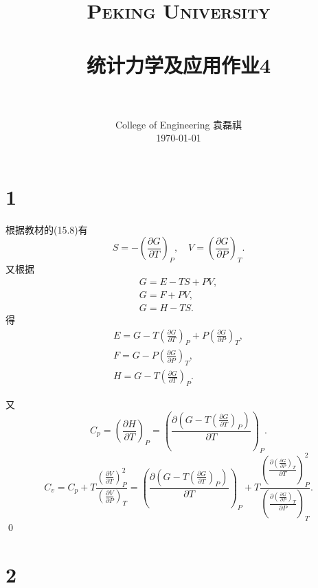 \documentclass[12pt]{article}
\title{
		\vspace{-1in} 	
		\usefont{OT1}{bch}{b}{n}
		\normalfont \normalsize \textsc{\LARGE Peking University}\\[1cm] %
		\horrule{0.5pt} \\[0.5cm]
		\huge \bfseries{统计力学及应用作业4} \\
		\horrule{2pt} \\[0.5cm]
}
\author{
		\normalfont 								\normalsize
		College of Engineering \quad 2001111690  \quad 袁磊祺\\	\normalsize
        \today
}
\date{}
\begin{document}


\maketitle

\section{1}

根据教材的(15.8)有
\begin{equation}
	S=-\left(\frac{\partial G}{\partial T}\right)_P,\quad V = \left(\frac{\partial G}{\partial P}\right)_T.
\end{equation}
又根据
\begin{gather}
	G = E-TS+PV,\\
	G=F+PV,\\
	G=H-TS.
\end{gather}
得
\begin{gather}
	E=G-T\left(\frac{\partial G}{\partial T}\right)_P+P\left(\frac{\partial G}{\partial P}\right)_T,\\
	F=G-P\left(\frac{\partial G}{\partial P}\right)_T,\\
	H=G-T\left(\frac{\partial G}{\partial T}\right)_P.
\end{gather}

又
\begin{equation}
	C_p = \left(\frac{\partial H}{\partial T}\right)_P = \left(\frac{\partial \left(G-T\left(\frac{\partial G}{\partial T}\right)_P\right)}{\partial T}\right)_P.
\end{equation}
\begin{equation}
	C_v=C_p+T\frac{\left(\frac{\partial V}{\partial T}\right)^2_P}{\left(\frac{\partial V}{\partial P}\right)_T}=\left(\frac{\partial \left(G-T\left(\frac{\partial G}{\partial T}\right)_P\right)}{\partial T}\right)_P+T\frac{\left(\frac{\partial \left(\frac{\partial G}{\partial P}\right)_T}{\partial T}\right)^2_P}{\left(\frac{\partial \left(\frac{\partial G}{\partial P}\right)_T}{\partial P}\right)_T}.
\end{equation}\qed


\section{2}
\end{document}
